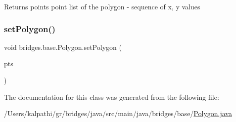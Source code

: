 \begin{DoxyReturn}{Returns}
points point list of the polygon -\/ sequence of x, y values 
\end{DoxyReturn}
\mbox{\label{classbridges_1_1base_1_1_polygon_ac92747578a038f747de9b2ccc90dc972}} 
\subsubsection{\texorpdfstring{setPolygon()}{setPolygon()}}
{\footnotesize\ttfamily void bridges.\+base.\+Polygon.\+set\+Polygon (\begin{DoxyParamCaption}\item[{Array\+List$<$ Float $>$}]{pts }\end{DoxyParamCaption})}



The documentation for this class was generated from the following file\+:\begin{DoxyCompactItemize}
\item 
/\+Users/kalpathi/gr/bridges/java/src/main/java/bridges/base/\mbox{\hyperlink{_polygon_8java}{Polygon.\+java}}\end{DoxyCompactItemize}
